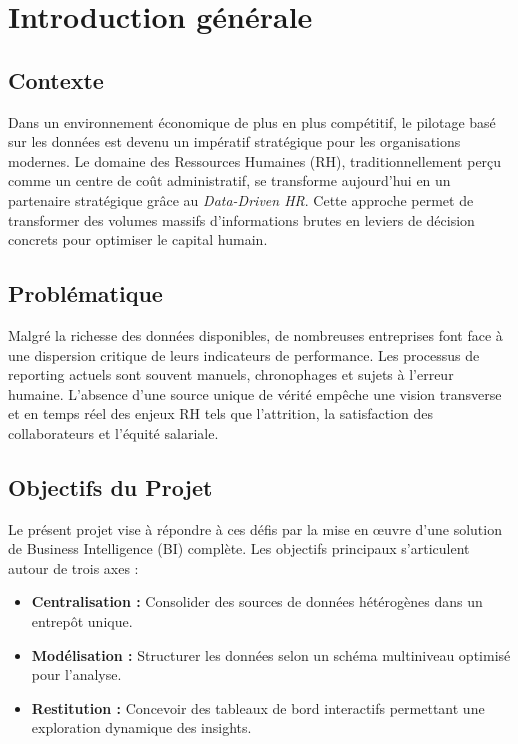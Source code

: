 \chapter*{Introduction générale}

\section*{Contexte}
Dans un environnement économique de plus en plus compétitif, le pilotage basé sur les données est devenu un impératif stratégique pour les organisations modernes. Le domaine des Ressources Humaines (RH), traditionnellement perçu comme un centre de coût administratif, se transforme aujourd'hui en un partenaire stratégique grâce au \textit{Data-Driven HR}. Cette approche permet de transformer des volumes massifs d'informations brutes en leviers de décision concrets pour optimiser le capital humain.

\section*{Problématique}
Malgré la richesse des données disponibles, de nombreuses entreprises font face à une dispersion critique de leurs indicateurs de performance. Les processus de reporting actuels sont souvent manuels, chronophages et sujets à l'erreur humaine. L'absence d'une source unique de vérité empêche une vision transverse et en temps réel des enjeux RH tels que l'attrition, la satisfaction des collaborateurs et l'équité salariale.

\section*{Objectifs du Projet}
Le présent projet vise à répondre à ces défis par la mise en œuvre d'une solution de Business Intelligence (BI) complète. Les objectifs principaux s'articulent autour de trois axes :
\begin{itemize}
    \item \textbf{Centralisation :} Consolider des sources de données hétérogènes dans un entrepôt unique.
    \item \textbf{Modélisation :} Structurer les données selon un schéma multiniveau optimisé pour l'analyse.
    \item \textbf{Restitution :} Concevoir des tableaux de bord interactifs permettant une exploration dynamique des insights.
\end{itemize}

